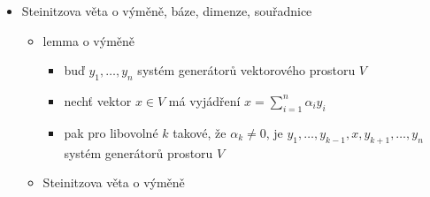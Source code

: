\begin{itemize}
\begin{itemize}
\begin{itemize}
\item lineární kombinace vektorů $v_1,\dots,v_k \in V$ nad $\mathbb K$ je libovolný vektor $u = \alpha_1v_1+\dots+\alpha_kv_k$, kde $\alpha_1,\dots,\alpha_k \in \mathbb K$
\end{itemize}
\item lineárně nezávislé vektory
\begin{itemize}
\item množina vektorů $X$ je lineárně nezávislá, pokud nulový vektor nelze získat netriviální lineární kombinací vektorů z $X$; v ostatních případech je množina $X$ lineárně závislá
\item vektory $v_1,\dots,v_n$ jsou lineárně nezávislé $\equiv$ $\sum_{i=1}^n \alpha_iv_i=o \iff \alpha_1=\dots=\alpha_n=0$
\end{itemize}
\item lineární obal (podprostor generovaný množinou)
\begin{itemize}
\item lineární obal $\mathcal L(X)$ podmnožiny $X$ vektorového prostoru $V$ je průnik všech podprostorů $U$ z $V$, které obsahují $X$
\item alternativní značení: $\mathrm{span}(X)$
\item pro $X \subseteq V$ platí $\text{span}(X)=\bigcap U:U\Subset V, X\subseteq U$
\item jde o podprostor generovaný $X$, vektory v množině $X$ se označují jako generátory podprostoru
\end{itemize}
\item věta: průnik podprostorů je taky podprostor
\item věta: $\mathcal L(X)$ je množina všech lineárních kombinací vektorů z $X$
\end{itemize}
\item Steinitzova věta o výměně, báze, dimenze, souřadnice
\begin{itemize}
\item lemma o výměně
\begin{itemize}
\item buď $y_1,\dots,y_n$ systém generátorů vektorového prostoru $V$
\item nechť vektor $x \in V$ má vyjádření $x = \sum_{i=1}^n\alpha_iy_i$
\item pak pro libovolné $k$ takové, že $\alpha_k \neq 0$, je $y_1,\dots,y_{k-1},x,y_{k+1},\dots,y_n$ systém generátorů prostoru $V$
\end{itemize}
\item Steinitzova věta o výměně

\end{itemize}
\end{itemize}

